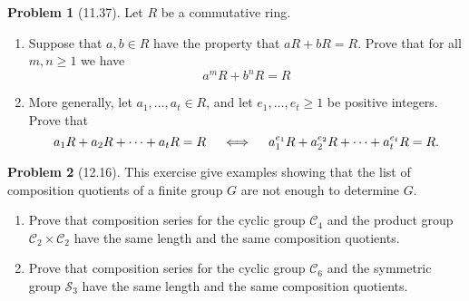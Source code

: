 \documentclass[12pt]{article}
\theoremstyle{definition}
\newtheorem{problem}{Problem}
\begin{document}
\begin{problem}[11.37]
    Let $R$ be a commutative ring.
    \begin{enumerate}[label=(\alph*)]
        \item Suppose that $a, b \in R$ have the property that $aR + bR = R$. Prove that for all $m, n \geq 1$
        we have 
        \[
            a^mR + b^nR = R
        \]
        \begin{solution}

        \end{solution}

        \item More generally, let $a_1, \ldots, a_t \in R$, and let $e_1, \ldots, e_t \geq 1$ be positive integers.
        Prove that 
        \[
            a_1R + a_2R + \cdots + a_tR = R \hspace{10px} \iff \hspace{10px} a_1^{e_1}R + a_2^{e_2}R + \cdots + a_t^{e_t}R = R.
        \]
        \begin{solution}

        \end{solution}
    \end{enumerate}
\end{problem}

\begin{problem}[12.16]
    This exercise give examples showing that the list of composition quotients of a finite group $G$
    are not enough to determine $G$.
    \begin{enumerate}[label=(\alph*)]
        \item Prove that composition series for the cyclic group $\mathcal{C}_4$ and the product group $\mathcal{C}_2 \times \mathcal{C}_2$
        have the same length and the same composition quotients.
        \begin{solution}

        \end{solution}

        \item Prove that composition series for the cyclic group $\mathcal{C}_6$ and the symmetric group $\mathcal{S}_3$ have the
        same length and the same composition quotients.
        \begin{solution}

        \end{solution}
    \end{enumerate}
\end{problem}
\end{document}
